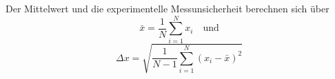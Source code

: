Der Mittelwert und die experimentelle Messunsicherheit berechnen sich über 
\begin{equation}
    \bar{x}=\frac{1}{N}\sum_{i=1}^N x_i \quad \text{und}
\end{equation}
\begin{equation}
    \Delta x = \sqrt{\frac{1}{N-1} \sum_{i=1}^N (x_i-\bar{x})^2}
\end{equation}